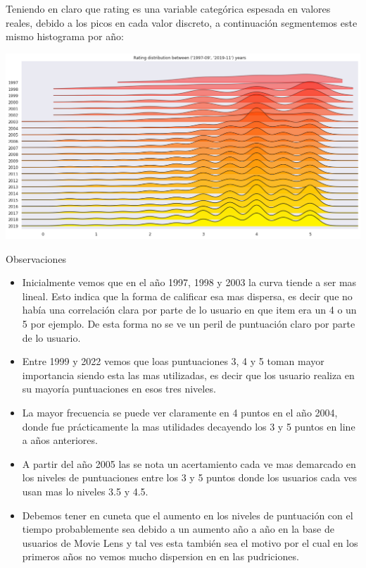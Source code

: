 \documentclass[11pt,a4paper,twoside]{thesis}
\begin{document}
Teniendo en claro que rating es una variable categórica espesada en valores reales, debido a los picos en cada valor discreto, a continuación segmentemos este mismo histograma por año:

\begin{center}
	\includegraphics[width=15cm]{./images/rating-by-year.png}
\end{center}
\begin{description}
	\item[Observaciones]
\end{description}
\begin{itemize}
	\item Inicialmente vemos que en el año 1997, 1998 y 2003 la curva tiende a ser mas lineal. Esto indica que la forma de calificar esa mas dispersa, es decir que no había una correlación clara por parte de lo usuario en que item era un 4 o un 5 por ejemplo. De esta forma no se ve un peril de puntuación claro por parte de lo usuario.
	\item Entre 1999 y 2022 vemos que loas puntuaciones 3, 4 y 5 toman mayor importancia siendo esta las mas utilizadas, es decir que los usuario realiza en su mayoría puntuaciones en esos tres niveles.
	\item La mayor frecuencia se puede ver claramente en 4 puntos en el año 2004, donde fue prácticamente la mas utilidades decayendo los 3 y 5 puntos en line a años anteriores.
	\item A partir del año 2005 las se nota un acertamiento cada ve mas demarcado en los niveles de puntuaciones entre los 3 y 5 puntos donde los usuarios cada ves usan mas lo niveles 3.5 y 4.5.
	\item Debemos tener en cuneta que el aumento en los niveles de puntuación con el tiempo probablemente sea debido a un aumento año a año en la base de usuarios de Movie Lens y tal ves esta también sea el motivo por el cual en los primeros años no vemos mucho dispersion en en las pudriciones.
\end{itemize}
\end{document}
